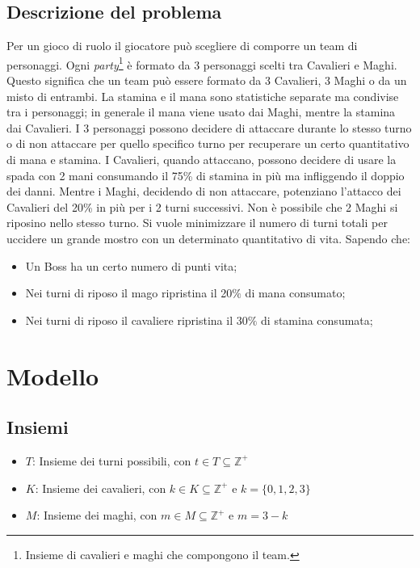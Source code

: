 \documentclass[12pt]{article}
\begin{document}
    \subsection{Descrizione del problema}
    Per un gioco di ruolo il giocatore può scegliere di comporre un team di personaggi.
    Ogni \textit{party}\footnote{Insieme di cavalieri e maghi che compongono il team.} è formato da 3 personaggi scelti tra Cavalieri e Maghi. Questo significa che un team può essere formato da 3 Cavalieri, 3 Maghi o da un misto di entrambi. 
    La stamina e il mana sono statistiche separate ma condivise tra i personaggi; in generale
    il mana viene usato dai Maghi, mentre la stamina dai Cavalieri.
    I 3 personaggi possono decidere di attaccare durante lo stesso turno o di non attaccare per quello specifico turno per recuperare un certo quantitativo di mana e stamina.
    I Cavalieri, quando attaccano, possono decidere di usare la spada con 2 mani consumando il 75\% di stamina in più ma infliggendo il doppio dei danni. Mentre i Maghi, decidendo di non attaccare, potenziano l'attacco dei Cavalieri del 20\% in più per i 2 turni successivi. Non è possibile che 2 Maghi si riposino nello stesso turno. Si vuole minimizzare il numero di turni totali per uccidere un grande mostro con un determinato quantitativo di vita. Sapendo che:
    \begin{itemize}
        \item Un Boss ha un certo numero di punti vita;
        \item Nei turni di riposo il mago ripristina il 20$\%$ di mana consumato;
        \item Nei turni di riposo il cavaliere ripristina il 30$\%$ di stamina consumata;
    \end{itemize}

    \section{Modello}
    \subsection{Insiemi}
    \begin{itemize}
        \item $T$: Insieme dei turni possibili, con $t \in T \subseteq \mathbb{Z}^+$
        \item $K$: Insieme dei cavalieri, con $k \in K \subseteq \mathbb{Z}^+$ e $k = \{ 0,1,2,3 \}$
        \item $M$: Insieme dei maghi, con $m \in M \subseteq \mathbb{Z}^+$ e $m = 3- k$
    \end{itemize}
\end{document}
